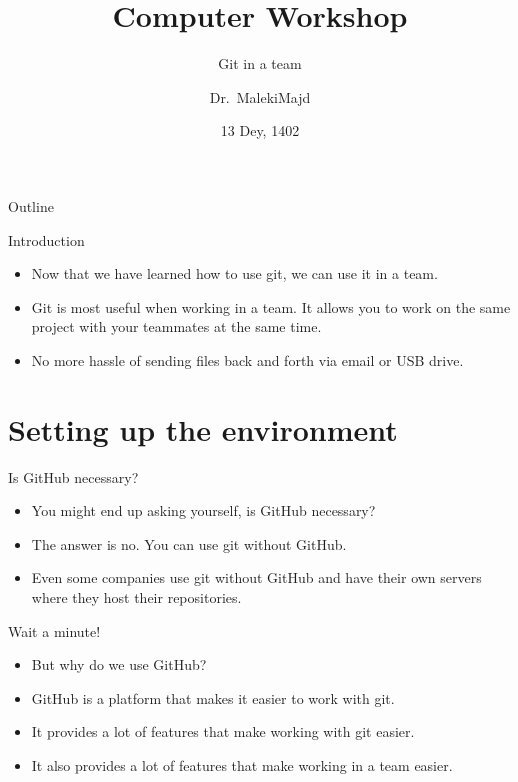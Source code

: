\documentclass{beamer}
\title{Computer Workshop}
\subtitle{Git in a team}
\author{Dr.\ MalekiMajd}
\institute[IUST]{Iran University Of Science And Technology}
\date{13 Dey, 1402}
\begin{document}
\frame{\titlepage}

\begin{frame}{Outline}
    \tableofcontents
\end{frame}

\begin{frame}{Introduction}
    \begin{itemize}
        \item Now that we have learned how to use git, we can use it in a team.
        \item Git is most useful when working in a team. It allows you to work on the same project with your teammates at the same time.
        \item No more hassle of sending files back and forth via email or USB drive.
    \end{itemize}
\end{frame}

\section{Setting up the environment}

\begin{frame}{Is GitHub necessary?}
    \begin{itemize}
        \item You might end up asking yourself, is GitHub necessary?
        \item The answer is no. You can use git without GitHub.
        \item Even some companies use git without GitHub and have their own servers where they host their repositories.
    \end{itemize}
\end{frame}

\begin{frame}{Wait a minute!}
    \begin{itemize}
        \item But why do we use GitHub?
        \item GitHub is a platform that makes it easier to work with git.
        \item It provides a lot of features that make working with git easier.
        \item It also provides a lot of features that make working in a team easier.
    \end{itemize}
\end{frame}
\end{document}
